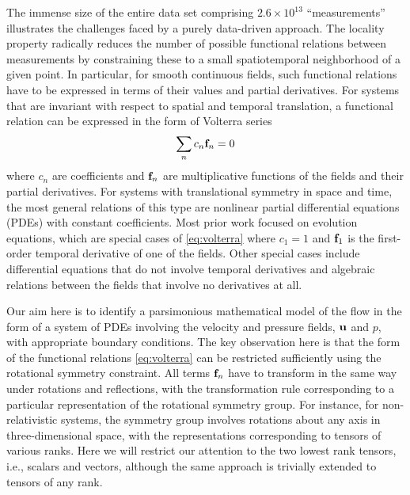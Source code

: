 \documentclass[
 reprint,
 amsmath,amssymb,
 aps,
]{revtex4-2}
\begin{document}
The immense size of the entire data set comprising $2.6\times 10^{13}$ ``measurements'' illustrates the challenges faced by a purely data-driven approach. The locality property radically reduces the number of possible functional relations between measurements by constraining these to a small spatiotemporal neighborhood of a given point. In particular, for smooth continuous fields, such functional relations have to be expressed in terms of their values and partial derivatives. For systems that are invariant with respect to spatial and temporal translation,
a functional relation can be expressed in the form of Volterra series
\begin{equation}\label{eq:volterra}
\sum_n c_n {\bf f}_n = 0
\end{equation}
where $c_n$ are coefficients and ${\bf f}_n$ are multiplicative functions of the fields and their partial derivatives. For systems with translational symmetry in space and time, the most general relations of this type are nonlinear partial differential equations (PDEs) with constant coefficients. Most prior work focused on evolution equations, which are special cases of \eqref{eq:volterra} where $c_1=1$ and ${\bf f}_1$ is the first-order temporal derivative of one of the fields. Other special cases include differential equations that do not involve temporal derivatives and algebraic relations between the fields that involve no derivatives at all.

Our aim here is to identify a parsimonious mathematical model of the flow in the form of a system of PDEs involving the velocity and pressure fields, ${\bf u}$ and $p$, with appropriate boundary conditions. The key observation here is that the form of the functional relations \eqref{eq:volterra} can be restricted sufficiently using the rotational symmetry constraint. All terms ${\bf f}_n$ have to transform in the same way under rotations and reflections, with the transformation rule corresponding to a particular representation of the rotational symmetry group. For instance, for non-relativistic systems, the symmetry group involves rotations about any axis in three-dimensional space, with the representations corresponding to tensors of various ranks. Here we will restrict our attention to the two lowest rank tensors, i.e., scalars and vectors, although the same approach is trivially extended to tensors of any rank.
\end{document}
